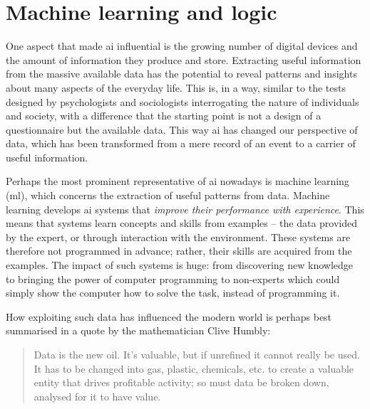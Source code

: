 \section{Machine learning and logic}
\label{sec:intro_ml}


One aspect that made \gls{ai} influential is the growing number of digital devices and the amount of information they produce and store.
Extracting useful information from the massive available data has the potential to reveal patterns and insights about many aspects of the everyday life.
This is, in a way, similar to the tests designed by psychologists and sociologists interrogating the nature of individuals and society, with a difference that the starting point is not a design of a questionnaire but the available data.
This way \gls{ai} has changed our perspective of data, which has been transformed from a mere record of an event to a carrier of useful information.

Perhaps the most prominent representative of \gls{ai} nowadays is machine learning (\gls{ml}), which concerns the extraction of useful patterns from data.
Machine learning develops \gls{ai} systems that \textit{improve their performance with experience}.
This means that systems learn concepts and skills from examples -- the data provided by the expert, or through interaction with the environment.
These systems are therefore not programmed in advance; rather, their skills are acquired from the examples.
The impact of such systems is huge: from discovering new knowledge to bringing the power of computer programming to non-experts which could simply show the computer how to solve the task, instead of programming it.



How exploiting such data has influenced the modern world is perhaps best summarised  in a quote by the mathematician Clive Humbly:
\begin{quote}
	Data is the new oil. It’s valuable, but if unrefined it cannot really be used. It has to be changed into gas, plastic, chemicals, etc. to create a valuable entity that drives profitable activity; so must data be broken down, analysed for it to have value.
\end{quote}




